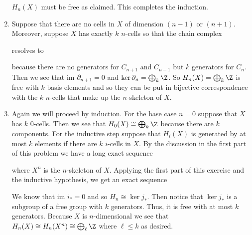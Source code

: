 \documentclass{article}
\newcommand{\im}{\text{im }}
\begin{document}
\begin{solution}{\parindent}
\begin{enumerate}
    $H_n(X)$ must be free as claimed. This completes the induction.
  \item Suppose that there are no cells in $X$ of dimension $(n-1)$ or
    $(n+1)$. Moreover, suppose $X$ has exactly $k$ $n$-cells so that
    the chain complex
    \begin{center}
    \end{center}
    resolves to
    \begin{center}
    \end{center}
    because there are no generators for $C_{n+1}$ and $C_{n-1}$ but
    $k$ generators for $C_n$. Then we see that $\im \partial_{n+1} =
    0$ and $\ker \partial_n = \bigoplus_k \Z$. So $H_n(X) =
    \bigoplus_k \Z$ is free with $k$ basis elements and so they can be
    put in bijective correspondence with the $k$ $n$-cells that make
    up the $n$-skeleton of $X$.
  \item Again we will proceed by induction. For the base case $n=0$
    suppose that $X$ has $k$ 0-cells. Then we see that $H_0(X) \cong
    \bigoplus_k\Z$ because there are $k$ components. For the inductive
    step suppose that $H_i(X)$ is generated by at most $k$ elements if
    there are $k$ $i$-cells in $X$. By the discussion in the first
    part of this problem we have a long exact sequence
    \begin{center}
    \end{center}
    where $X^n$ is the $n$-skeleton of $X$. Applying the first part of
    this exercise and the inductive hypothesis, we get an exact
    sequence
    \begin{center}
    \end{center}
    We know that $\im i_\ast = 0$ and so $H_n \cong \ker j_\ast$. Then
    notice that $\ker j_\ast$ is a subgroup of a free group with $k$
    generators. Thus, it is free with at most $k$ generators. Because
    $X$ is $n$-dimensional we see that $H_n(X) \cong H_n(X^n) \cong
    \bigoplus_\ell \Z$ where $\ell \leq k$ as desired.
\end{enumerate}
\end{solution}
\end{document}

